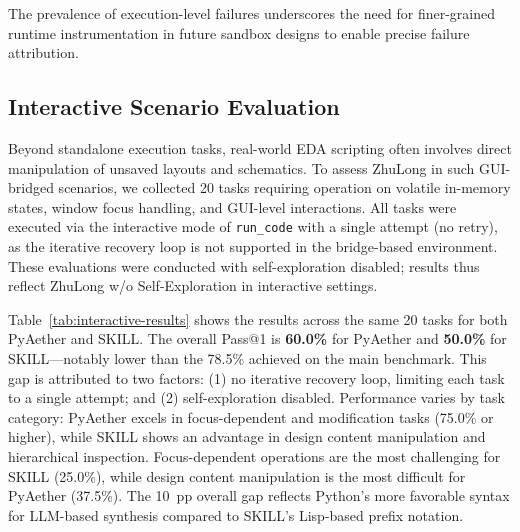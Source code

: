 \documentclass[anonymous, sigconf]{acmart}
\begin{document}
The prevalence of execution-level failures underscores the need for finer-grained runtime instrumentation in future sandbox designs to enable precise failure attribution.

\subsection{Interactive Scenario Evaluation}
\label{sec:exp-interactive}

Beyond standalone execution tasks, real-world EDA scripting often involves direct manipulation of unsaved layouts and schematics. To assess ZhuLong in such GUI-bridged scenarios, we collected 20 tasks requiring operation on volatile in-memory states, window focus handling, and GUI-level interactions. All tasks were executed via the interactive mode of \texttt{run\_code} with a single attempt (no retry), as the iterative recovery loop is not supported in the bridge-based environment. These evaluations were conducted with self-exploration disabled; results thus reflect ZhuLong w/o Self-Exploration in interactive settings.

Table~\ref{tab:interactive-results} shows the results across the same 20 tasks for both PyAether and SKILL. The overall Pass@1 is \textbf{60.0\%} for PyAether and \textbf{50.0\%} for SKILL—notably lower than the 78.5\% achieved on the main benchmark. This gap is attributed to two factors: (1) no iterative recovery loop, limiting each task to a single attempt; and (2) self-exploration disabled. Performance varies by task category: PyAether excels in focus-dependent and modification tasks (75.0\% or higher), while SKILL shows an advantage in design content manipulation and hierarchical inspection. Focus-dependent operations are the most challenging for SKILL (25.0\%), while design content manipulation is the most difficult for PyAether (37.5\%). The 10~pp overall gap reflects Python's more favorable syntax for LLM-based synthesis compared to SKILL's Lisp-based prefix notation.
\end{document}
